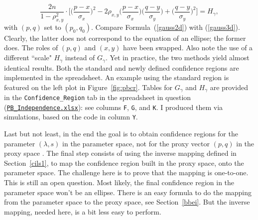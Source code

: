 \documentclass[10pt]{article}
\begin{document}
\begin{Exercise}
\begin{equation}
\frac{2n}{1-\rho_{x,y}^2}\cdot 
\Big[\Big( \frac{p-x}{\sigma_x}\Big)^2 
-2\rho_{x,y}\Big(\frac{p-x}{\sigma_x}\Big)\Big(\frac{q-y}{\sigma_y}\Big) 
+ \Big(\frac{q-y}{\sigma_y}\Big)^2\Big] = H_\gamma,\label{gauss3d}
\end{equation}
 with $(p,q)$ set to $(p_0,q_0)$. Compare Formula~(\ref{gauss2d}) with (\ref{gauss3d}). Clearly, the latter does not correspond to the equation of an ellipse; the former does. The roles of $(p,q)$ and $(x,y)$ have been swapped. Also note the use of a different ``scale" $H_\gamma$
 instead of $G_\gamma$. Yet in practice, the two methods yield almost identical results. Both the standard and newly defined confidence regions are implemented in the 
spreadsheet.  An example using the standard region is featured on the left plot in Figure~\ref{fig:pbcr}. Tables for $G_\gamma$ and $H_\gamma$ are provided
in the \texttt{Confidence\_Region} tab in the spreadsheet in question 
(\href{https://github.com/VincentGranville/Point-Processes/tree/main/Spreadsheets}{\texttt{PB\_Independence.xlsx}}): see columns \texttt{F}, \texttt{G}, and \texttt{K}. I produced them via simulations, based on the code
in column \texttt{Y}.

Last but not least, in the end the goal is to obtain confidence regions for the parameter $(\lambda,s)$ in the parameter space, not for the proxy 
vector $(p,q)$ in the proxy space . The final step consists of using the inverse mapping defined in Section~\ref{cils1}, to map the confidence region built in the proxy space, onto the parameter space. The challenge here is to
prove that the mapping is one-to-one. This is still an open question. Most likely, the final confidence region in the parameter space won't be an ellipse. There is an easy formula to do the mapping from the parameter space to the proxy space, see Section~\ref{bbei}. But the inverse mapping, needed here, is a bit less easy to perform.
\end{Exercise}
\end{document}
